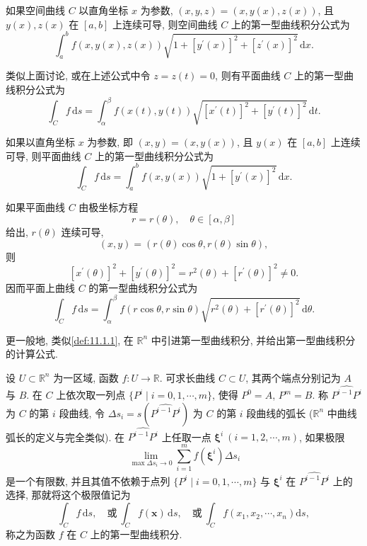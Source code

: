 如果空间曲线 $C$ 以直角坐标 $x$ 为参数, $(x, y, z)=(x, y(x), z(x))$, 且 $y(x), z(x)$ 在 $[a, b]$ 上连续可导, 则空间曲线 $C$ 上的第一型曲线积分公式为
\[
  \int_{a}^{b} f(x, y(x), z(x)) \sqrt{1+\left[y^{\prime}(x)\right]^{2}+\left[z^{\prime}(x)\right]^{2}}\,\mathrm{d} x.
\]

类似上面讨论, 或在上述公式中令 $z=z(t)=0$, 则有平面曲线 $C$ 上的第一型曲线积分公式为
\[
  \int_{C} f\,\mathrm{d} s=\int_{\alpha}^{\beta} f(x(t), y(t)) \sqrt{\left[x^{\prime}(t)\right]^{2}+\left[y^{\prime}(t)\right]^{2}}\,\mathrm{d} t.
\]

如果以直角坐标 $x$ 为参数, 即 $(x, y)=(x, y(x))$, 且 $y(x)$ 在 $[a, b]$ 上连续可导, 则平面曲线 $C$ 上的第一型曲线积分公式为
\[
  \int_{C} f\,\mathrm{d} s=\int_{a}^{b} f(x, y(x)) \sqrt{1+\left[y^{\prime}(x)\right]^{2}}\,\mathrm{d} x.
\]

如果平面曲线 $C$ 由极坐标方程
\[
  r=r(\theta), \quad \theta \in[\alpha, \beta]
\]
给出, $r(\theta)$ 连续可导,
\[
  (x, y)=(r(\theta) \cos \theta, r(\theta) \sin \theta),
\]
则
\[
  \left[x^{\prime}(\theta)\right]^{2}+\left[y^{\prime}(\theta)\right]^{2}=r^{2}(\theta)+\left[r^{\prime}(\theta)\right]^{2} \neq 0.
\]
因而平面上曲线 $C$ 的第一型曲线积分公式为
\[
  \int_{C} f\,\mathrm{d} s=\int_{\alpha}^{\beta} f(r \cos \theta, r \sin \theta) \sqrt{r^{2}(\theta)+\left[r^{\prime}(\theta)\right]^{2}}\,\mathrm{d} \theta.
\]

更一般地, 类似\cref{def:11.1.1}, 在 $\mathbb{R}^{n}$ 中引进第一型曲线积分, 并给出第一型曲线积分的计算公式.

\begin{definitionp}\label{def:11.1.1p}
设 $U \subset \mathbb{R}^{n}$ 为一区域, 函数 $f: U \to \mathbb{R}$. 可求长曲线 $C \subset U$, 其两个端点分别记为 $A$ 与 $B$. 在 $C$ 上依次取一列点 $\{P^{i} \mid i=0,1,\cdots,m\}$, 使得 $P^{0}=A$, $P^{m}=B$. 称 $\widehat{P^{i-1} P^{i}}$ 为 $C$ 的第 $i$ 段曲线, 令 $\Delta s_{i}=s\left(\widehat{P^{i-1} P^{i}}\right)$ 为 $C$ 的第 $i$ 段曲线的弧长 ($\mathbb{R}^{n}$ 中曲线弧长的定义与完全类似). 在 $\widehat{P^{i-1} P^{i}}$ 上任取一点 $\boldsymbol{\xi}^{i}\ (i=1,2,\cdots,m)$, 如果极限
\[
  \lim _{\max \Delta s_{i} \to 0} \sum_{i=1}^{m} f\left(\boldsymbol{\xi}^{i}\right) \Delta s_{i}
\]
是一个有限数, 并且其值不依赖于点列 $\{P^{i} \mid i=0,1,\cdots,m\}$ 与 $\boldsymbol{\xi}^{i}$ 在 $\widehat{P^{i-1} P^{i}}$ 上的选择, 那就将这个极限值记为
\[
  \int_{C} f\,\mathrm{d} s, \quad \text{或}\ \int_{C} f(\boldsymbol{x})\,\mathrm{d} s, \quad \text{或}\ \int_{C} f\left(x_{1}, x_{2}, \cdots, x_{n}\right) \mathrm{d} s,
\]
称之为函数 $f$ 在 $C$ 上的第一型曲线积分.
\end{definitionp}

